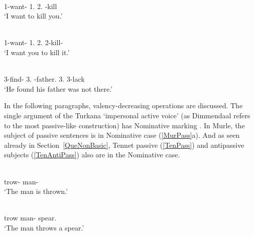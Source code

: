 \begin{exe}\ex\label{TurDep}
\begin{xlist}
\ex\gll {} \textbf{}  \\
1\sg{}-want-\asp{} 1\sg{}.\nom{} 2\sg{}.\acc{} \Inf{}-kill\\
\glt `I want to kill you.'
 
\ex\gll {}  \textbf{} \\
1\sg{}-want-\asp{} 1\sg{}.\nom{} 2\sg{}.\acc{} 2\sg{}-kill-\asp{}\\
\glt `I want you to kill it.'

\ex\gll{}  \textbf{}  \\
3-find-\ventiv{} 3\sg{}.\nom{} \NC{}-father.\acc{} 3\sg{}.\poss{} 3-lack\\
\glt `He found his father was not there.'
\end{xlist}
\end{exe}

In the following paragraphs, valency-decreasing operations are discussed.
The single argument of the {Turkana} `impersonal active voice' (as Dimmendaal refers to the most passive-like construction) has Nominative  marking \citep[132--133]{Dimmendaal:1982}. 
In Murle, the subject of passive sentences is in Nominative  case (\ref{MurPass}a).
And as seen already in Section~\ref{QueNonBasic}, Tennet passive (\ref{TenPass}) and antipassive subjects (\ref{TenAntiPass}) also are in the Nominative  case. 

\begin{exe}\ex\label{MurPass}
\begin{xlist}
\ex\gll {} \\
trow-\pass{} man-\nom{}\\
\glt `The man is thrown.' %

\ex\gll{}  \\
trow man-\nom{} spear.\acc{}\\
\glt `The man throws a spear.' %
\end{xlist}
\end{exe}

